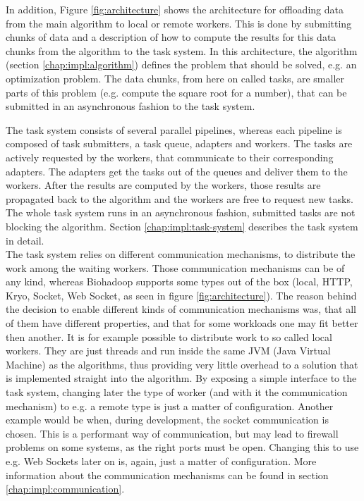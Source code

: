   In addition, Figure \ref{fig:architecture} shows the architecture for offloading data from the main algorithm to local or remote workers. This is done by submitting chunks of data and a description of how to compute the results for this data chunks from the algorithm to the task system. In this architecture, the algorithm (section \ref{chap:impl:algorithm}) defines the problem that should be solved, e.g. an optimization problem. The data chunks, from here on called tasks, are smaller parts of this problem (e.g. compute the square root for a number), that can be submitted in an asynchronous fashion to the task system.
  
  The task system consists of several parallel pipelines, whereas each pipeline is composed of task submitters, a task queue, adapters and workers. The tasks are actively requested by the workers, that communicate to their corresponding adapters. The adapters get the tasks out of the queues and deliver them to the workers. After the results are computed by the workers, those results are propagated back to the algorithm and the workers are free to request new tasks. The whole task system runs in an asynchronous fashion, submitted tasks are not blocking the algorithm. Section \ref{chap:impl:task-system} describes the task system in detail.\\
  
  The task system relies on different communication mechanisms, to distribute the work among the waiting workers. Those communication mechanisms can be of any kind, whereas Biohadoop supports some types out of the box (local, HTTP, Kryo, Socket, Web Socket, as seen in figure \ref{fig:architecture}). The reason behind the decision to enable different kinds of communication mechanisms was, that all of them have different properties, and that for some workloads one may fit better then another. It is for example possible to distribute work to so called local workers. They are just threads and run inside the same JVM (Java Virtual Machine) as the algorithms, thus providing very little overhead to a solution that is implemented straight into the algorithm. By exposing a simple interface to the task system, changing later the type of worker (and with it the communication mechanism) to e.g. a remote type is just a matter of configuration. Another example would be when, during development, the socket communication is chosen. This is a performant way of communication, but may lead to firewall problems on some systems, as the right ports must be open. Changing this to use e.g. Web Sockets later on is, again, just a matter of configuration. More information about the communication mechanisms can be found in section \ref{chap:impl:communication}.\\
  
